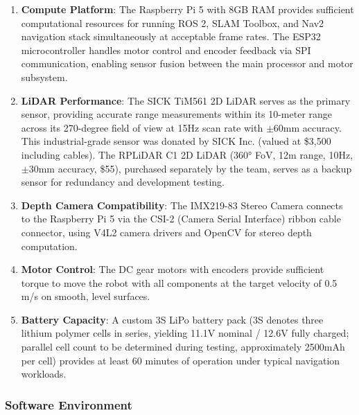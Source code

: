 \begin{enumerate}
    \item \textbf{Compute Platform}: The Raspberry Pi 5 with 8GB RAM provides sufficient computational resources for running ROS 2, SLAM Toolbox, and Nav2 navigation stack simultaneously at acceptable frame rates. The ESP32 microcontroller handles motor control and encoder feedback via SPI communication, enabling sensor fusion between the main processor and motor subsystem.

    \item \textbf{LiDAR Performance}: The SICK TiM561 2D LiDAR serves as the primary sensor, providing accurate range measurements within its 10-meter range across its 270-degree field of view at 15Hz scan rate with $\pm$60mm accuracy. This industrial-grade sensor was donated by SICK Inc. (valued at \$3,500 including cables). The RPLiDAR C1 2D LiDAR (360° FoV, 12m range, 10Hz, $\pm$30mm accuracy, \$55), purchased separately by the team, serves as a backup sensor for redundancy and development testing.

    \item \textbf{Depth Camera Compatibility}: The IMX219-83 Stereo Camera connects to the Raspberry Pi 5 via the CSI-2 (Camera Serial Interface) ribbon cable connector, using V4L2 camera drivers and OpenCV for stereo depth computation.

    \item \textbf{Motor Control}: The DC gear motors with encoders provide sufficient torque to move the robot with all components at the target velocity of 0.5 m/s on smooth, level surfaces.

    \item \textbf{Battery Capacity}: A custom 3S LiPo battery pack (3S denotes three lithium polymer cells in series, yielding 11.1V nominal / 12.6V fully charged; parallel cell count to be determined during testing, approximately 2500mAh per cell) provides at least 60 minutes of operation under typical navigation workloads.
\end{enumerate}

\subsubsection{Software Environment}

